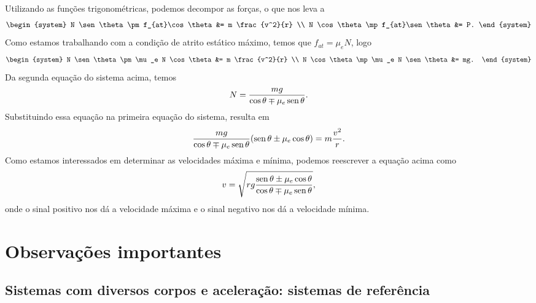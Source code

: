 Utilizando as funções trigonométricas, podemos decompor as forças, o que nos leva a
\begin{equation}
\begin{system}
    N \sen\theta \pm f_{at}\cos\theta &= m \frac{v^2}{r} \\
    N \cos\theta \mp f_{at}\sen\theta &= P.
\end{system}
\end{equation}
%
Como estamos trabalhando com a condição de atrito estático máximo, temos que $f_{at} = \mu_e N$, logo
\begin{equation}
\begin{system}
    N \sen\theta \pm \mu_e N \cos\theta &= m \frac{v^2}{r} \\
    N \cos\theta \mp \mu_e N \sen\theta &= mg.
\end{system}
\end{equation}
%
Da segunda equação do sistema acima, temos
\begin{equation}
    N = \frac{mg}{\cos\theta \mp \mu_e\operatorname{sen}\theta}.
\end{equation}
%
Substituindo essa equação na primeira equação do sistema, resulta em
\begin{equation}
    \frac{mg}{\cos\theta \mp \mu_e\operatorname{sen}\theta} (\operatorname{sen}\theta \pm \mu_e \cos\theta) = m\frac{v^2}{r}.
\end{equation}
%
Como estamos interessados em determinar as velocidades máxima e mínima, podemos reescrever a equação acima como
\begin{equation}
    v = \sqrt{rg \frac{\operatorname{sen}\theta \pm \mu_e \cos\theta}{\cos\theta \mp \mu_e\operatorname{sen}\theta}},
\end{equation}
%
onde o sinal positivo nos dá a velocidade máxima e o sinal negativo nos dá a velocidade mínima.

\section{Observações importantes}

\subsection{Sistemas com diversos corpos e aceleração: sistemas de referência}

